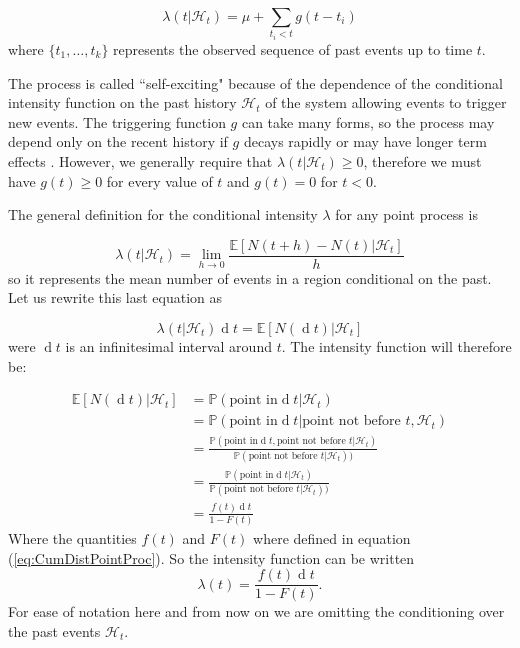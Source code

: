 \documentclass[11pt,a4paper]{article}
\renewcommand{\d}[1]{\ensuremath{\operatorname{d}\!{#1}}}
\begin{document}
\begin{equation*}
    \lambda(t|\mathcal{H}_t) = \mu + \sum_{t_i < t} g(t - t_i)
\end{equation*}
where $\{ t_1, \dots, t_k\}$ represents the observed sequence of past events up to time $t$.

The process is called ``self-exciting" because of the dependence of the conditional intensity function on the past history $\mathcal{H}_t$ of the system allowing events to trigger new events. The triggering function $g$ can take many forms, so the process may depend only on the recent history if $g$ decays rapidly or may have longer term effects \cite{Reinhart}. However, we generally require that $\lambda(t | \mathcal{H}_t)  \geq 0$, therefore we must have $g(t) \geq 0$ for every value of $t$ and $g(t) = 0$ for $t < 0$.

The general definition for the conditional intensity $\lambda$ for any point process is

\begin{equation*}
    \lambda(t | \mathcal{H}_t) = \lim_{h \to 0} \frac{\mathbb{E}[N(t+h) - N(t) | \mathcal{H}_t]}{h}
\end{equation*}
so it represents the mean number of events in a region conditional on the past.
Let us rewrite this last equation as \cite{Rasmussen}

\begin{equation*}
    \lambda(t | \mathcal{H}_t) \d t = \mathbb{E}[N(\d t) | \mathcal{H}_t]
\end{equation*}
were $\d t$ is an infinitesimal interval around $t$.
The intensity function will therefore be:

\begin{align*}
    \mathbb{E}[N(\d t) | \mathcal{H}_t] &= \mathbb{P}(\textrm{point in} \d t | \mathcal{H}_t) \\
    & = \mathbb{P}(\textrm{point in} \d t | \textrm{point not before } t, \mathcal{H}_t) \\
    & = \frac{\mathbb{P}(\textrm{point in} \d t, \textrm{point not before } t | \mathcal{H}_t)}{\mathbb{P}(\textrm{point not before } t | \mathcal{H}_t))} \\
    & = \frac{\mathbb{P}(\textrm{point in} \d t | \mathcal{H}_t)}{\mathbb{P}(\textrm{point not before } t | \mathcal{H}_t))} \\
    & = \frac{f(t) \d t}{1 - F(t)}
\end{align*}
Where the quantities $f(t)$ and $F(t)$ where defined in equation (\ref{eq:CumDistPointProc}). So the intensity function can be written
\begin{equation}\label{eq:IntFun}
    \lambda(t) = \frac{f(t) \d t}{1 - F(t)}.
\end{equation}
For ease of notation here and from now on we are omitting the conditioning over the past events $\mathcal{H}_t$.
\end{document}
